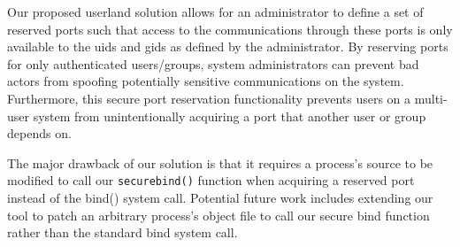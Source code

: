 \documentclass{sig-alternate}
\begin{document}
Our proposed userland solution allows for an administrator to define a set of reserved ports such that access to the communications through these ports is only available to the uids and gids as defined by the administrator. By reserving ports for only authenticated users/groups, system administrators can prevent bad actors from spoofing potentially sensitive communications on the system. Furthermore, this secure port reservation functionality prevents users on a multi-user system from unintentionally acquiring a port that another user or group depends on.

The major drawback of our solution is that it requires a process's source to be modified to call our \texttt{secure\textunderscore bind()} function when acquiring a reserved port instead of the bind() system call. Potential future work includes extending our tool to patch an arbitrary process's object file to call our secure bind function rather than the standard bind system call.


%
%
\end{document}
